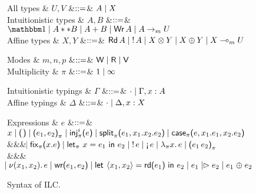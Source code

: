 \begin{figure*}[t]
  \begin{grammar}
    All types
    & $U,V$
    &$\mathrel{::=}$& $A \mathrel{\mid} X$
    \\
    Intuitionistic types
    & $A,B$
    &$\mathrel{::=}$& $\tyUnit \bnfalt \tyProd{A}{B} \bnfalt \tySum{A}{B} \bnfalt
    \tyWr{A} \bnfalt \tyArr{A}{\footnotesize m}{U}$
    \\
    Affine types
    & $X,Y$
    &$\mathrel{::=}$& $\text{\textsf{Rd}}\,A \mathrel{\mid} {!}\,{A} \mathrel{\mid} {X}\otimes{Y} \mathrel{\mid} X \oplus
    Y \mathrel{\mid} {X}\multimap_{\footnotesize m}{U}$
  \end{grammar}
  \vspace{-.1cm}
  \begin{minipage}{.4\textwidth}
    \begin{grammar}
      Modes & $m,n,p$ &$\mathrel{::=}$& $\textsf{W} \mathrel{\mid} \textsf{R} \mathrel{\mid} \textsf{V}$
      \\
      Multiplicity & $\pi$ &$\mathrel{::=}$& $1 \mathrel{\mid} \infty$      
    \end{grammar}
  \end{minipage}%
  \begin{minipage}{.4\textwidth}
    \begin{grammar}
      Intuitionistic typings
      & $\Gamma$
      &$\mathrel{::=}$& $\cdot \mathrel{\mid} \Gamma,x:A$
      \\
      Affine typings
      & $\Delta$
      &$\mathrel{::=}$& $\cdot \mathrel{\mid} \Delta,x:X$
    \end{grammar}    
  \end{minipage}
  \begin{grammar}
    Expressions
    & $e$
        &$\mathrel{::=}$&
        $\eVar{x} \bnfalt \eUnit \bnfalt \ePair{e_1}{e_2}{\pi} \bnfalt \eInj{\pi}{i}{e} \bnfalt \eSplit{\pi}{e_1}{x_1}{x_2}{e_2} \bnfalt
    \eCase{\pi}{e}{x_1}{e_1}{x_2}{e_2}$
    \\ &&& $\hspace{-1.02ex}\mathrel{\mid} \text{\textsf{fix}}_{\pi}\textsf{(}{x}.{e}\textsf{)}
    \mathrel{\mid} \text{\textsf{let}}_{\pi}\ {x} = {e_1}\ \text{\textsf{in}}\ {e_2} \mathrel{\mid} {!}\,{e} \mathrel{\mid} \textnormal{!`}\,{e} \mathrel{\mid}
    \lambda_{\pi}{x}.\,{e} \mathrel{\mid} {\textsf{(} e_1\,e_2\textsf{)}}_{\pi}$
    \\ &&& $\hspace{-1.02ex}\mathrel{\mid} \nu(x_1,x_2).\,e \mathrel{\mid} \text{\textsf{wr}}\textsf{(}{e_1},{e_2}\textsf{)}
    \mathrel{\mid} \text{\textsf{let}}_{}\ {\langle{x_1},{x_2}\rangle} = {\text{\textsf{rd}}\textsf{(}{e_1}\textsf{)}}\ \text{\textsf{in}}\ {{e_2}} \mathrel{\mid} e_1 \mathrel{|\rhd} e_2 \mathrel{\mid} e_1 \mathrel{\oplus} e_2$
  \end{grammar}
  \caption{Syntax of ILC.}
  \label{fig:ilc-syntax}
\end{figure*}
